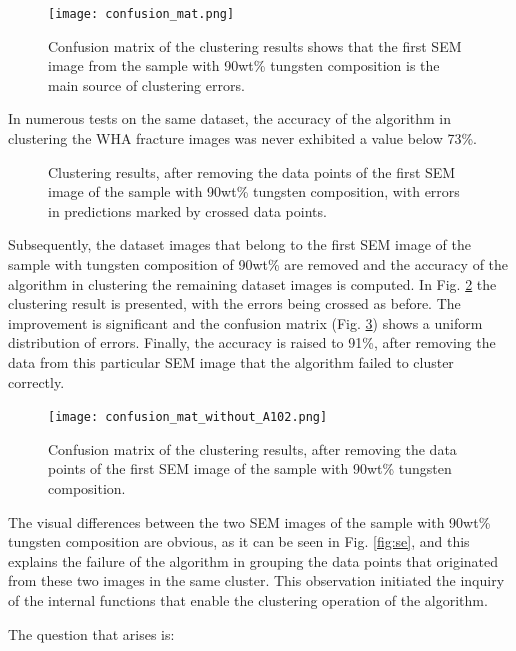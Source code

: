 \documentclass[authoryear,preprint,review,12pt, singleside]{elsarticle}
\begin{document}
\begin{figure}[!h]
	\centering
	\texttt{[image: confusion\_mat.png]}
	\caption{Confusion matrix of the clustering results shows that the first SEM image from the sample with 90wt\% tungsten composition is the main source of clustering errors.}
	\label{fig:confusion_mat}
\end{figure} 

In numerous tests on the same dataset, the accuracy of the algorithm in clustering the WHA fracture images was never exhibited a value below 73\%.


\begin{figure}[!h]
	\centering
	\caption{Clustering results, after removing the data points of the first SEM image of the sample with 90wt\% tungsten composition, with errors in predictions marked by crossed data points.}
	\label{fig:cluster_result_errors2}
\end{figure}


Subsequently, the dataset images that belong to the first SEM image of the sample with tungsten composition of 90wt\% are removed and the accuracy of the algorithm in clustering the remaining dataset images  is computed. In Fig. \ref{fig:cluster_result_errors2} the clustering result is presented, with the errors being crossed as before. The improvement is significant and the confusion matrix (Fig. \ref{fig:confusion_mat2}) shows a uniform distribution of errors. Finally, the accuracy is raised to 91\%, after removing the data from this particular SEM image that the algorithm failed to cluster correctly. 

\begin{figure}[!h]
	\centering
	\texttt{[image: confusion\_mat\_without\_A102.png]}
	\caption{Confusion matrix of the clustering results, after removing the data points of the first SEM image of the sample with 90wt\% tungsten composition.}
	\label{fig:confusion_mat2}
\end{figure} 

The visual differences between the two SEM images of the sample with 90wt\% tungsten composition are obvious, as it can be seen in Fig. \ref{fig:se}, and this explains the failure of the algorithm in grouping the data points that originated from these two images in the same cluster. This observation initiated the inquiry of the internal functions that enable the clustering operation of the algorithm. 

The question that arises is:
\end{document}
